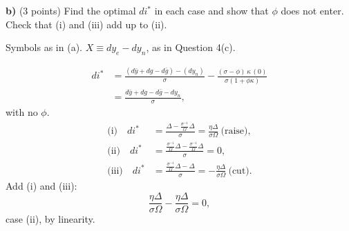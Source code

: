 \textbf{b)} (3 points) Find the optimal $di^*$ in each case and show that $\phi$ does not enter. Check that (i) and (iii) add up to (ii).
\resolespaco
\begin{sol}
\begin{notacao}
\item Symbols as in (a). $X\equiv dy_e-dy_n$, as in Question 4(c).
\end{notacao}
\begin{align}
di^*&=\frac{(d\bar y+dg-d\bar g)-(dy_n)}{\sigma}-\frac{(\sigma-\phi)\,\kappa\,(0)}{\sigma(1+\phi\kappa)}\nonumber\\
&=\frac{d\bar y+dg-d\bar g-dy_n}{\sigma} , \label{q10:di}
\end{align}
with no $\phi$.
\begin{align*}
\text{(i)}\quad di^*&=\frac{\Delta-\frac{\sigma^{-1}}{\Omega}\Delta}{\sigma}=\frac{\eta\Delta}{\sigma\Omega}\ \text{(raise)},\\
\text{(ii)}\quad di^*&=\frac{\frac{\sigma^{-1}}{\Omega}\Delta-\frac{\sigma^{-1}}{\Omega}\Delta}{\sigma}=0,\\
\text{(iii)}\quad di^*&=\frac{\frac{\sigma^{-1}}{\Omega}\Delta-\Delta}{\sigma}=-\frac{\eta\Delta}{\sigma\Omega}\ \text{(cut)}.
\end{align*}
Add (i) and (iii):
\begin{equation}
\frac{\eta\Delta}{\sigma\Omega}-\frac{\eta\Delta}{\sigma\Omega}=0 , \nonumber
\end{equation}
case (ii), by linearity.
\end{sol}

